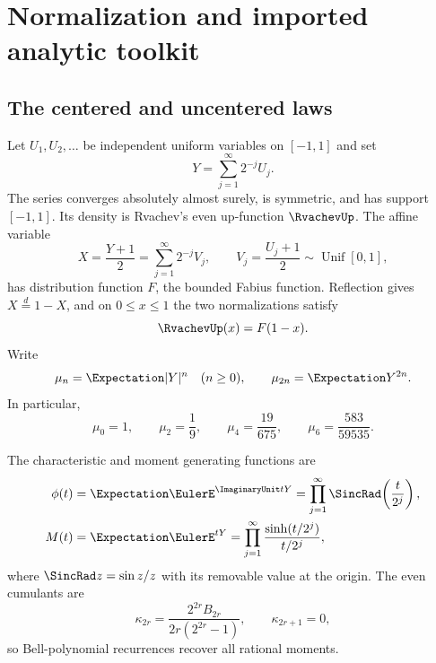 \documentclass[11pt,oneside]{article}
\theoremstyle{definition}
\theoremstyle{remark}
\begin{document}
\section{Normalization and imported analytic toolkit}
\label{sec:normalization}

\subsection{The centered and uncentered laws}

Let $U_1,U_2,\ldots$ be independent uniform variables on $[-1,1]$ and set
\begin{equation}
 Y=\sum_{j=1}^{\infty}2^{-j}U_j.                    \label{eq:Y-series}
\end{equation}
The series converges absolutely almost surely, is symmetric, and has support
$[-1,1]$.  Its density is Rvachev's even up-function $\RvachevUp$.  The affine variable
\begin{equation}
 X=\frac{Y+1}{2}
   =\sum_{j=1}^{\infty}2^{-j}V_j,
 \qquad V_j=\frac{U_j+1}{2}\sim\operatorname{Unif}[0,1],       \label{eq:X-series}
\end{equation}
has distribution function $F$, the bounded Fabius function.  Reflection gives
$X\stackrel d=1-X$, and on $0\le x\le1$ the two normalizations satisfy
\begin{equation}
 \RvachevUp(x)=F(1-x).                                      \label{eq:up-F}
\end{equation}
Write
\begin{equation}
 \mu_n=\Expectation|Y|^n\quad(n\ge0),
 \qquad \mu_{2n}=\Expectation Y^{2n}.                         \label{eq:mu-def}
\end{equation}
In particular,
\begin{equation}
 \mu_0=1,
 \qquad \mu_2=\frac19,
 \qquad \mu_4=\frac{19}{675},
 \qquad \mu_6=\frac{583}{59535}.                   \label{eq:first-moments}
\end{equation}

The characteristic and moment generating functions are
\begin{align}
 \phi(t)&=\Expectation\EulerE^{\ImaginaryUnit tY}
   =\prod_{j=1}^{\infty}\SincRad\!\left(\frac{t}{2^j}\right),
                                                               \label{eq:phi-product}\\
 M(t)&=\Expectation\EulerE^{tY}
   =\prod_{j=1}^{\infty}\frac{\sinh(t/2^j)}{t/2^j},             \label{eq:M-product}
\end{align}
where $\SincRad z=\sin z/z$ with its removable value at the origin.  The even
cumulants are
\begin{equation}
 \kappa_{2r}
 =\frac{2^{2r}B_{2r}}{2r(2^{2r}-1)},
 \qquad \kappa_{2r+1}=0,                            \label{eq:cumulants}
\end{equation}
so Bell-polynomial recurrences recover all rational moments.
\end{document}
